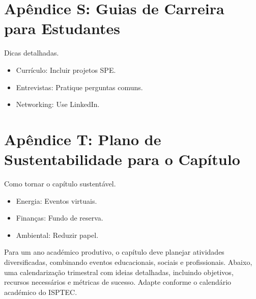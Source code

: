 \documentclass[12pt]{article}
\begin{document}
\clearpage
\section{Apêndice S: Guias de Carreira para Estudantes}

Dicas detalhadas.
\begin{itemize}
    \item Currículo: Incluir projetos SPE.
    \item Entrevistas: Pratique perguntas comuns.
    \item Networking: Use LinkedIn.
\end{itemize}

\clearpage
\section{Apêndice T: Plano de Sustentabilidade para o Capítulo}

Como tornar o capítulo sustentável.
\begin{itemize}
    \item Energia: Eventos virtuais.
    \item Finanças: Fundo de reserva.
    \item Ambiental: Reduzir papel.
\end{itemize}

Para um ano académico produtivo, o capítulo deve planejar atividades diversificadas, combinando eventos educacionais, sociais e profissionais. Abaixo, uma calendarização trimestral com ideias detalhadas, incluindo objetivos, recursos necessários e métricas de sucesso. Adapte conforme o calendário académico do ISPTEC.
\end{document}
